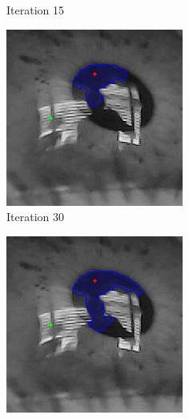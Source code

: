 \begin{figure}[h]
\begin{subfigure}{0.3\textwidth}
        \caption{Iteration 15}
    \end{subfigure}%
    \hfill
    \begin{subfigure}{0.3\textwidth}
        \centering
        \includegraphics[width=0.9\linewidth]{plots/acwe/iteration_30.png}
        \caption{Iteration 30}
    \end{subfigure}%
    \hfill
    \begin{subfigure}{0.3\textwidth}
        \centering
        \includegraphics[width=0.9\linewidth]{plots/acwe/iteration_60.png}

\end{subfigure}
\end{figure}
